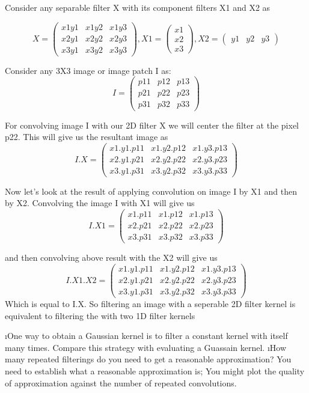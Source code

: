 \documentclass[fleqn]{article}
\begin{document}
\begin{solution}
Consider any separable filter X with its component filters X1 and X2 as

\[
X = 
\begin{pmatrix}
  x1y1 & x1y2 & x1y3\\
  x2y1 & x2y2 & x2y3\\
  x3y1 & x3y2 & x3y3
\end{pmatrix}
, X1 =
\begin{pmatrix}
  x1\\
  x2\\
  x3
\end{pmatrix}, X2 = 
\begin{pmatrix}
y1 & y2 & y3 
 \end{pmatrix}
\]

Consider any 3X3 image or image patch I as:
\[
I =
\begin{pmatrix}
p11 & p12 & p13\\ 
p21 & p22 & p23\\
p31 & p32 & p33
 \end{pmatrix}
\]

For convolving image I with our 2D filter X we will center the filter at the pixel p22. This will give us the resultant image as
\[
I.X = 
\begin{pmatrix}
x1.y1.p11 & x1.y2.p12 & x1.y3.p13\\ 
x2.y1.p21 & x2.y2.p22 & x2.y3.p23\\
x3.y1.p31 & x3.y2.p32 & x3.y3.p33
 \end{pmatrix}
\]

Now let's look at the result of applying convolution on image I by X1 and then by X2.
Convolving the image I with X1 will give us
\[
I.X1 = 
\begin{pmatrix}
x1.p11 & x1.p12 & x1.p13\\ 
x2.p21 & x2.p22 & x2.p23\\
x3.p31 & x3.p32 & x3.p33
 \end{pmatrix}
\]

and then convolving above result with the X2 will give us
\[
I.X1.X2 = 
\begin{pmatrix}
x1.y1.p11 & x1.y2.p12 & x1.y3.p13\\ 
x2.y1.p21 & x2.y2.p22 & x2.y3.p23\\
x3.y1.p31 & x3.y2.p32 & x3.y3.p33
 \end{pmatrix}
\]
Which is equal to I.X. So filtering an image with a seperable 2D filter kernel is equivalent to filtering the with two 1D filter kernels
\end{solution}
\newpage
\i One way to obtain a Gaussian kernel is to filter a constant kernel with itself many times. Compare this strategy with evaluating a Guassain kernel.
\bee
\i How many repeated filterings do you need to get a reasonable approximation? You need to establish what a reasonable approximation is; You might plot the quality of approximation against the number of repeated convolutions.

\end{document}
